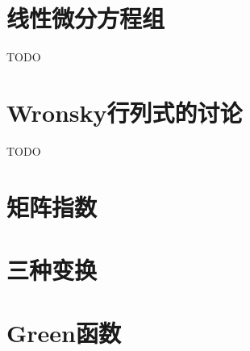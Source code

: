 














\section{线性微分方程组}

TODO







% 



\section{Wronsky行列式的讨论}
TODO


\section{矩阵指数}

\section{三种变换}

\section{Green函数}
 
